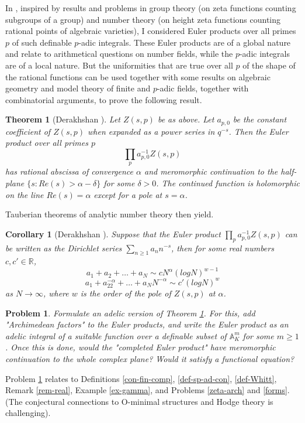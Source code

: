 \documentclass[12pt]{amsart}
\def\A{\mathbb{A}}
\def\R{\mathbb{R}}
\def\R{\mathbb{R}}
\newtheorem{thm}{Theorem}[section]
\newtheorem{cor}{Corollary}[section]
\numberwithin{equation}{section}
\newtheorem{prob}{Problem}[section]
\begin{document}
In \cite{zeta1}, inspired by results and problems in group theory (on zeta functions counting subgroups of a group) and number theory (on height zeta functions counting rational points of algebraic varieties), I 
considered Euler products over all primes $p$ of such definable $p$-adic integrals. These Euler products are of a global nature and relate to arithmetical questions on number fields, while the $p$-adic integrals are of a local nature. But the uniformities that are true over all $p$ of the shape of the rational functions can be used together with some results on algebraic geometry and model theory of finite and $p$-adic fields, together with combinatorial arguments, to prove the following result. 

\begin{thm}[Derakhshan {\cite{zeta1}}]\label{Thm-zeta} Let $Z(s,p)$ be as above. 
Let $a_{p,0}$ be the constant coefficient of $Z(s,p)$ when expanded as a power series in $q^{-s}$. Then the Euler product over all primes $p$ 
$$\prod_p a_{p,0}^{-1} Z(s,p)$$
has rational abscissa of convergence $\alpha$ and meromorphic continuation to the half-plane $\{s: Re(s)>\alpha -\delta\}$ for some $\delta>0$.
The continued function is holomorphic on the line $Re(s)=\alpha$ except for a pole at $s=\alpha$.\end{thm}
Tauberian theorems of analytic number theory then yield.
\begin{cor}[Derakhshan {\cite{zeta1}}] 
Suppose that the Euler product $\prod_p a_{p,0}^{-1} Z(s,p)$ can be written as the Dirichlet series $\sum_{n\geq 1} a_n n^{-s}$, then for some real numbers $c,c'\in \R$, 
$$a_1+a_2+\dots+a_N \sim c N^{\alpha}(log N)^{w-1}$$ 
$$a_1+a_22^{-\alpha}+\dots + a_N N^{-\alpha} \sim c'(log N)^w$$
as $N \rightarrow \infty$, where $w$ is the order of the pole of $Z(s,p)$ at $\alpha$.\end{cor}


\begin{prob}\label{prob-zeta} Formulate an adelic version of Theorem \ref{Thm-zeta}. For this, add "Archimedean factors" to the Euler products, and write the Euler product as an adelic integral of a suitable function over a definable subset of 
$\A_K^m$ for some $m\geq 1$. Once this is done, would the "completed 
Euler product" have meromorphic continuation to the whole complex plane? Would it satisfy a functional equation?
\end{prob}


Problem \ref{prob-zeta} relates to Definitions \ref{con-fin-comp}, \ref{def-sp-ad-con}, \ref{def-Whitt}, Remark \ref{rem-real}, Example \ref{ex-gamma}, and Problems \ref{zeta-arch} and \ref{forms}.  
(The conjectural connections to O-minimal structures and Hodge theory is challenging). 
\end{document}
